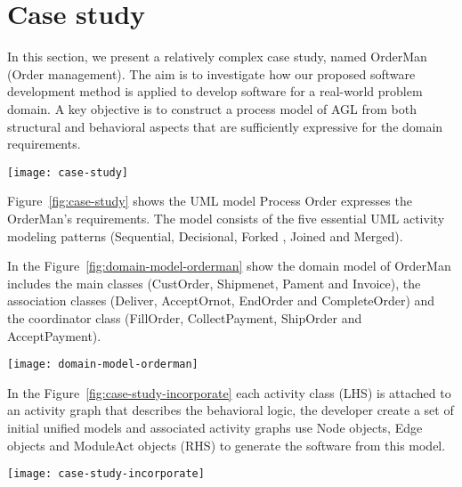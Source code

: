 \section{Case study}
\label{sect:case-study} %

In this section, we present a relatively complex case study, named OrderMan (Order management). The aim is to investigate how our proposed software development method is applied to develop software for a real-world problem domain. A key objective is to construct a process model of AGL from both structural and behavioral aspects that are sufficiently expressive for the domain requirements. 
\begin{figure*}[ht]
	\centering
	\texttt{[image: case-study]}
	\caption{the Process Order} %
	\label{fig:case-study}
\end{figure*}


Figure~\ref{fig:case-study} shows the UML model Process Order expresses the OrderMan’s requirements. The model consists of the five essential UML activity modeling patterns (Sequential, Decisional, Forked , Joined and Merged).


In the Figure~\ref{fig:domain-model-orderman} show the domain model of OrderMan includes the main classes (CustOrder, Shipmenet, Pament and Invoice), the association classes (Deliver, AcceptOrnot, EndOrder and CompleteOrder) and the coordinator class (FillOrder, CollectPayment, ShipOrder and AcceptPayment).
\begin{figure*}[ht]
	\centering
	\texttt{[image: domain-model-orderman]}
	\caption{ The essential domain model of OrderMan} %
	\label{fig:domain-model-orderman}
\end{figure*}

In the Figure~\ref{fig:case-study-incorporate} each activity class (LHS) is attached to an activity graph that describes the behavioral logic, the developer create a set of initial unified models and associated activity graphs use Node objects, Edge objects and ModuleAct objects (RHS) to generate the software from this model.
%
\begin{figure*}[ht]
	\centering
	\texttt{[image: case-study-incorporate]}
	\caption{(LHS) The unified model; (RHS) The Node objects, Edge objects of the activity graph and ModuleAct objects that are referenced by the Nodes} %
	\label{fig:case-study-incorporate}
\end{figure*}